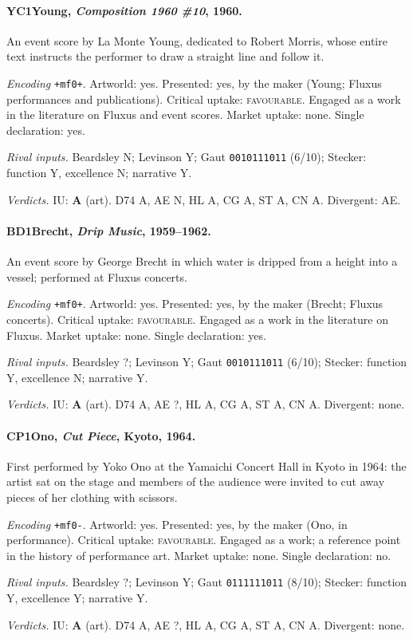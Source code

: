 \paragraph{YC1\enspace Young, \emph{Composition 1960 \#10}, 1960.}
An event score by La Monte Young, dedicated to Robert Morris, whose entire text instructs the performer to draw a straight line and follow it.\par
\noindent\textit{Encoding} \texttt{+mf0+}. Artworld: yes. Presented: yes, by the maker (Young; Fluxus performances and publications). Critical uptake: \textsc{favourable}. Engaged as a work in the literature on Fluxus and event scores. Market uptake: none. Single declaration: yes.\par
\noindent\textit{Rival inputs.} Beardsley N; Levinson Y; Gaut \texttt{0010111011} (6/10); Stecker: function Y, excellence N; narrative Y.\par
\noindent\textit{Verdicts.} IU: \textbf{A} (art). D74 A, AE N, HL A, CG A, ST A, CN A. Divergent: AE.\par

\paragraph{BD1\enspace Brecht, \emph{Drip Music}, 1959--1962.}
An event score by George Brecht in which water is dripped from a height into a vessel; performed at Fluxus concerts.\par
\noindent\textit{Encoding} \texttt{+mf0+}. Artworld: yes. Presented: yes, by the maker (Brecht; Fluxus concerts). Critical uptake: \textsc{favourable}. Engaged as a work in the literature on Fluxus. Market uptake: none. Single declaration: yes.\par
\noindent\textit{Rival inputs.} Beardsley ?; Levinson Y; Gaut \texttt{0010111011} (6/10); Stecker: function Y, excellence N; narrative Y.\par
\noindent\textit{Verdicts.} IU: \textbf{A} (art). D74 A, AE ?, HL A, CG A, ST A, CN A. Divergent: none.\par

\paragraph{CP1\enspace Ono, \emph{Cut Piece}, Kyoto, 1964.}
First performed by Yoko Ono at the Yamaichi Concert Hall in Kyoto in 1964: the artist sat on the stage and members of the audience were invited to cut away pieces of her clothing with scissors.\par
\noindent\textit{Encoding} \texttt{+mf0-}. Artworld: yes. Presented: yes, by the maker (Ono, in performance). Critical uptake: \textsc{favourable}. Engaged as a work; a reference point in the history of performance art. Market uptake: none. Single declaration: no.\par
\noindent\textit{Rival inputs.} Beardsley ?; Levinson Y; Gaut \texttt{0111111011} (8/10); Stecker: function Y, excellence Y; narrative Y.\par
\noindent\textit{Verdicts.} IU: \textbf{A} (art). D74 A, AE ?, HL A, CG A, ST A, CN A. Divergent: none.\par

